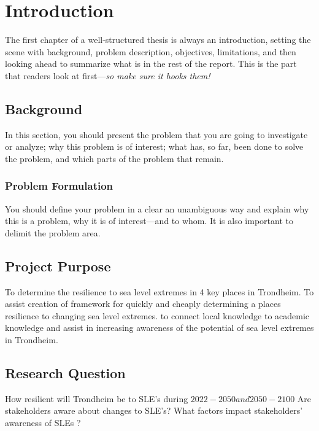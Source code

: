 \chapter{Introduction}
The first chapter of a well-structured thesis is always an introduction, setting the scene with background, problem description, objectives, limitations, and then looking ahead to summarize what is in the rest of the report. This is the part that readers look at first---\emph{so make sure it hooks them!}



\section{Background}
In this section, you should present the problem that you are going to investigate or analyze; why this problem is of interest; what has, so far, been done to solve the problem, and which parts of the problem that remain.
\subsection*{Problem Formulation}
You should define your problem in a clear an unambiguous way and explain why this is a problem, why it is of interest---and to whom. It is also important to delimit the problem area.

\section{Project Purpose}
To determine the resilience to sea level extremes in 4 key places in Trondheim. To assist creation of framework for quickly and cheaply determining a places resilience to changing sea level extremes. to connect local knowledge to academic knowledge and assist in increasing awareness of the potential of sea level extremes in Trondheim. 

\section{Research Question}
 How resilient will Trondheim be to SLE’s during $2022-2050 and 2050 -2100$
Are stakeholders aware about changes to SLE’s?
What factors impact stakeholders’ awareness of SLEs ?

